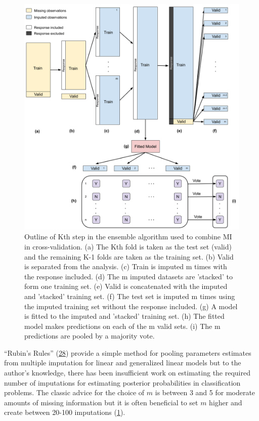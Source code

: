 \documentclass[12pt,]{article}
\begin{document}
\begin{figure}[H]

{\centering \includegraphics[width=1\linewidth]{images/ensemble-imputation} 

}

\caption{\label{fig:ensemble-imputation}Outline of Kth step in the ensemble algorithm used to combine MI in cross-validation.  (a) The Kth fold is taken as the test set (valid) and the remaining K-1 folds are taken as the training set. (b) Valid is separated from the analysis. (c) Train is imputed m times with the response included. (d) The m imputed datasets are 'stacked' to form one training set.  (e) Valid is concatenated with the imputed and 'stacked' training set.  (f) The test set is imputed m times using the imputed training set without the response included.  (g) A model is fitted to the imputed and 'stacked' training set.  (h) The fitted model makes predictions on each of the m valid sets.  (i) The m predictions are pooled by a majority vote.}\label{fig:unnamed-chunk-2}
\end{figure}

\newpage  

``Rubin's Rules'' (\protect\hyperlink{ref-rubin_inference_1976}{28})
provide a simple method for pooling parameters estimates from multiple
imputation for linear and generalized linear models but to the author's
knowledge, there has been insufficient work on estimating the required
number of imputations for estimating posterior probabilities in
classification problems. The classic advice for the choice of \(m\) is
between 3 and 5 for moderate amounts of missing information but it is
often beneficial to set \(m\) higher and create between 20-100
imputations (\protect\hyperlink{ref-van_buuren_flexible_2012}{1}).
\end{document}
